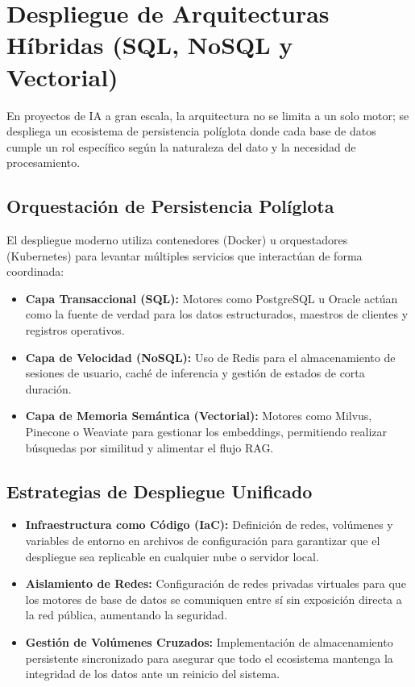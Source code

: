\documentclass[12pt,a4paper,openany,oneside]{book}
\begin{document}
\section{Despliegue de Arquitecturas Híbridas (SQL, NoSQL y Vectorial)}

En proyectos de IA a gran escala, la arquitectura no se limita a un solo motor; se despliega un ecosistema de persistencia políglota donde cada base de datos cumple un rol específico según la naturaleza del dato y la necesidad de procesamiento.

\subsection{Orquestación de Persistencia Políglota}
El despliegue moderno utiliza contenedores (Docker) u orquestadores (Kubernetes) para levantar múltiples servicios que interactúan de forma coordinada:
\begin{itemize}
    \item \textbf{Capa Transaccional (SQL):} Motores como PostgreSQL u Oracle actúan como la fuente de verdad para los datos estructurados, maestros de clientes y registros operativos.
    \item \textbf{Capa de Velocidad (NoSQL):} Uso de Redis para el almacenamiento de sesiones de usuario, caché de inferencia y gestión de estados de corta duración.
    \item \textbf{Capa de Memoria Semántica (Vectorial):} Motores como Milvus, Pinecone o Weaviate para gestionar los embeddings, permitiendo realizar búsquedas por similitud y alimentar el flujo RAG.
\end{itemize}



\subsection{Estrategias de Despliegue Unificado}
\begin{itemize}
    \item \textbf{Infraestructura como Código (IaC):} Definición de redes, volúmenes y variables de entorno en archivos de configuración para garantizar que el despliegue sea replicable en cualquier nube o servidor local.
    \item \textbf{Aislamiento de Redes:} Configuración de redes privadas virtuales para que los motores de base de datos se comuniquen entre sí sin exposición directa a la red pública, aumentando la seguridad.
    \item \textbf{Gestión de Volúmenes Cruzados:} Implementación de almacenamiento persistente sincronizado para asegurar que todo el ecosistema mantenga la integridad de los datos ante un reinicio del sistema.
\end{itemize}
\end{document}
